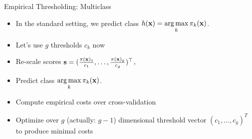 \documentclass[11pt,compress,t,notes=noshow, xcolor=table]{beamer}
\begin{document}
\begin{vbframe}{Empirical Thresholding: Multiclass}
    \begin{itemize}
        
        
            \item In the standard setting, we predict class $h(\mathbf{x}) = \mathop{\mathrm{arg\,max}}\limits_{k} \pi_{k}(\mathbf{x})$.
            
            \item Let's use $g$ thresholds $c_k$ now 
            
            \item Re-scale scores $ \mathbf{s} = (\frac{\pi(\mathbf{x})_1}{c_1},\ldots, \frac{\pi(\mathbf{x})_g}{ c_g})^\top$, 
            \item Predict class $\mathop{\mathrm{arg\,max}}\limits_k \pi_{k}(\mathbf{x}) $.

            \item Compute empirical costs over cross-validation

            \item Optimize over $g$ (actually: $g-1$) dimensional threshold vector $(c_1, \ldots, c_g)^T$ to produce minimal costs

    \end{itemize}
\end{vbframe}
\end{document}
